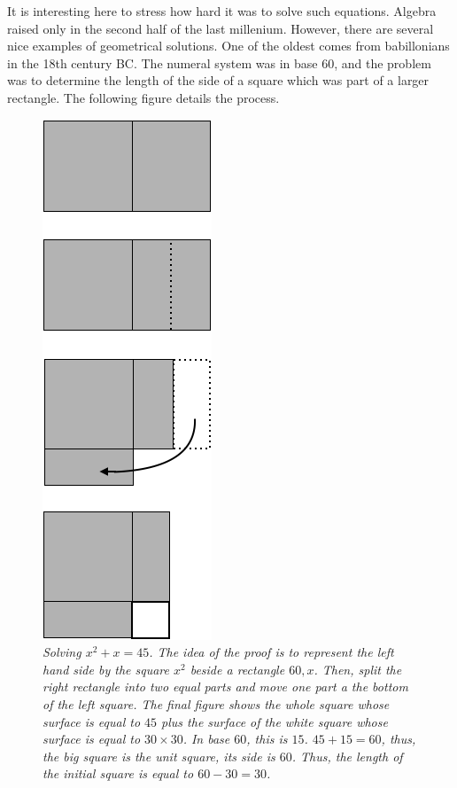 {\Denis It is interesting here to stress how hard it was to solve such equations. Algebra raised only in the second half of the last millenium.
However, there are several nice examples of geometrical solutions.
One of the oldest comes from babillonians in the 18th century BC.
The numeral system was in base 60, and the problem was to determine the length of the side of a square which was part of a larger rectangle.
The following figure details the process.}
\begin{figure}[htb]
\begin{center}
       \includegraphics[scale=0.4]{FiguresArithmetic/tabletteMesopotamie}
\caption{{\it Solving $x^2 + x = 45$.
The idea of the proof is to represent the left hand side by the square $x^2$ beside a rectangle $60,x$.
Then, split the right rectangle into two equal parts and move one part a the bottom of the left square.
The final figure shows the whole square whose surface is equal to $45$ plus the surface of the white square
whose surface is equal to $30 \times 30$.
In base $60$, this is $15$. 
$45+15 = 60$, thus, the big square is the unit square, its side is $60$.
Thus, the length of the initial square is equal to $60-30=30$.}
\label{fig:equationBabillon}}
\end{center}
\end{figure}

